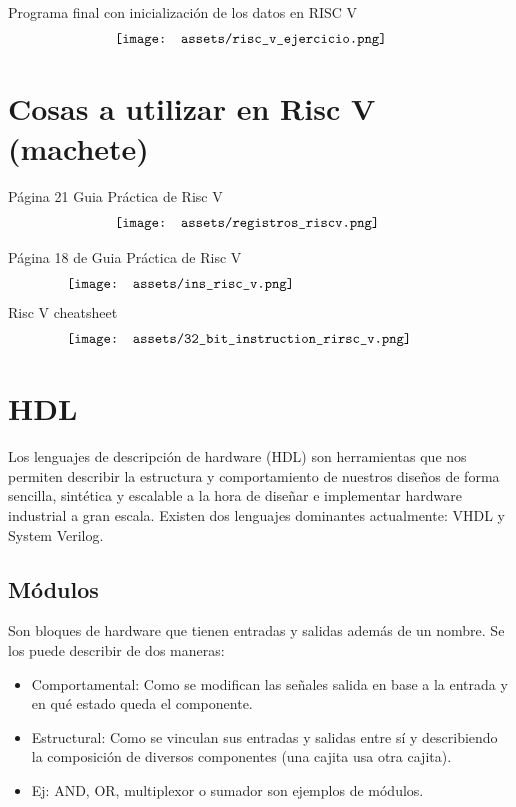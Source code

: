 \documentclass[10pt,a4paper]{article}
\begin{document}
Programa final con inicialización de los datos en RISC V
\[\begin{minipage}[b]{0.6\textwidth}
    \texttt{[image: assets/risc\_v\_ejercicio.png]}
    \label{fig:risc_v_ejercicio}
\end{minipage}\]

\section*{Cosas a utilizar en Risc V (machete)}

Página 21 Guia Práctica de Risc V
\[\begin{minipage}[b]{0.6\textwidth}
    \texttt{[image: assets/registros\_riscv.png]}
    \label{fig:registros_riscv}
\end{minipage}\]

Página 18 de Guia Práctica de Risc V
\[\begin{minipage}[b]{0.8\textwidth}
    \texttt{[image: assets/ins\_risc\_v.png]}
    \label{fig:ins_risc_v}
\end{minipage}\]
Risc V cheatsheet
\[\begin{minipage}[b]{0.8\textwidth}
    \texttt{[image: assets/32\_bit\_instruction\_rirsc\_v.png]}
    \label{fig:32_bit_instruction_rirsc_v}
\end{minipage}\]

\section*{HDL}
Los lenguajes de descripción de hardware (HDL) son herramientas que nos permiten describir la estructura y comportamiento de nuestros diseños de forma sencilla, sintética y escalable a la hora de diseñar e implementar hardware industrial a gran escala.
Existen dos lenguajes dominantes actualmente: VHDL y System Verilog. 
\subsection*{Módulos}
Son bloques de hardware que tienen entradas y salidas además de un nombre. Se los puede describir de dos maneras:
\begin{itemize}
    \item Comportamental: Como se modifican las señales salida en base a la entrada y en qué estado queda el componente.
    \item Estructural: Como se vinculan sus entradas y salidas entre sí y describiendo la composición de diversos componentes (una cajita usa otra cajita).
    \item Ej: AND, OR, multiplexor o sumador son ejemplos de módulos.
\end{itemize}
\end{document}
